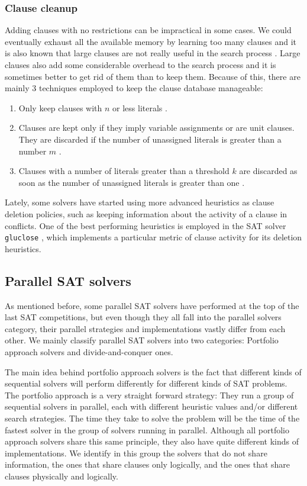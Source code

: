 \documentclass[12pt]{diicc}
\begin{document}
\subsubsection{Clause cleanup}

Adding clauses with no restrictions can be impractical in some cases. We could eventually exhaust all the available memory by learning too many clauses and it is also known that large clauses are not really useful in the search process \cite{grasp}. Large clauses also add some considerable overhead to the search process and it is sometimes better to get rid of them than to keep them. Because of this, there are mainly 3 techniques employed to keep the clause database manageable:

\begin{enumerate}
	\item Only keep clauses with $n$ or less literals \cite{dec90}.
	\item Clauses are kept only if they imply variable assignments or are unit clauses. They are discarded if the number of unassigned literals is greater than a number $m$ \cite{bs97}.
	\item Clauses with a number of literals greater than a threshold $k$ are discarded as soon as the number of unassigned literals is greater than one \cite{grasp}.
\end{enumerate}

Lately, some solvers have started using more advanced heuristics as clause deletion policies, such as keeping information about the activity of a clause in conflicts. One of the best performing heuristics is employed in the SAT solver \texttt{gluclose} \cite{gluclose}, which implements a particular metric of clause activity for its deletion heuristics.

\subsection{Parallel SAT solvers}

As mentioned before, some parallel SAT solvers have performed at the top of the last SAT competitions, but even though they all fall into the parallel solvers category, their parallel strategies and implementations vastly differ from each other. We mainly classify parallel SAT solvers into two categories: Portfolio approach solvers and divide-and-conquer ones.

The main idea behind portfolio approach solvers is the fact that different kinds of sequential solvers will perform differently for different kinds of SAT problems. The portfolio approach is a very straight forward strategy: They run a group of sequential solvers in parallel, each with different heuristic values and/or different search strategies. The time they take to solve the problem will be the time of the fastest solver in the group of solvers running in parallel. Although all portfolio approach solvers share this same principle, they also have quite different kinds of implementations. We identify in this group the solvers that do not share information, the ones that share clauses only logically, and the ones that share clauses physically and logically.
\end{document}
